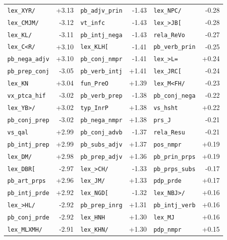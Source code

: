 \begin{longtable}{lrlrlr}
\texttt{lex\_XYR/} & +3.13 & \texttt{pb\_adjv\_prin} & -1.43 & \texttt{lex\_NPC/} & -0.28 \\
\texttt{lex\_CMJM/} & -3.12 & \texttt{vt\_infc} & -1.43 & \texttt{lex\_\textgreater{}JB[} & -0.28 \\
\texttt{lex\_KL/} & -3.11 & \texttt{pb\_intj\_nega} & -1.43 & \texttt{rela\_ReVo} & -0.27 \\
\texttt{lex\_C\textless{}R/} & +3.10 & \texttt{lex\_KLH[} & -1.41 & \texttt{pb\_verb\_prin} & -0.25 \\
\texttt{pb\_nega\_adjv} & +3.10 & \texttt{pb\_conj\_nmpr} & -1.41 & \texttt{lex\_\textgreater{}L=} & +0.24 \\
\texttt{pb\_prep\_conj} & -3.05 & \texttt{pb\_verb\_intj} & +1.41 & \texttt{lex\_JRC[} & -0.24 \\
\texttt{lex\_KN} & +3.04 & \texttt{fun\_PreO} & +1.39 & \texttt{lex\_M\textless{}FH/} & -0.23 \\
\texttt{vx\_ptca\_hif} & -3.02 & \texttt{pb\_verb\_prep} & -1.38 & \texttt{pb\_conj\_nega} & -0.22 \\
\texttt{lex\_YB\textgreater{}/} & +3.02 & \texttt{typ\_InrP} & +1.38 & \texttt{vs\_hsht} & +0.22 \\
\texttt{pb\_conj\_prep} & -3.02 & \texttt{pb\_nega\_nmpr} & +1.38 & \texttt{prs\_J} & -0.21 \\
\texttt{vs\_qal} & +2.99 & \texttt{pb\_conj\_advb} & -1.37 & \texttt{rela\_Resu} & -0.21 \\
\texttt{pb\_intj\_prep} & +2.99 & \texttt{pb\_subs\_adjv} & +1.37 & \texttt{pos\_nmpr} & +0.19 \\
\texttt{lex\_DM/} & +2.98 & \texttt{pb\_prep\_adjv} & +1.36 & \texttt{pb\_prin\_prps} & +0.19 \\
\texttt{lex\_DBR[} & -2.97 & \texttt{lex\_\textgreater{}CH/} & -1.33 & \texttt{pb\_prps\_subs} & -0.17 \\
\texttt{pb\_art\_prps} & +2.96 & \texttt{lex\_JM/} & +1.33 & \texttt{pdp\_prde} & +0.17 \\
\texttt{pb\_intj\_prde} & +2.92 & \texttt{lex\_NGD[} & -1.32 & \texttt{lex\_NBJ\textgreater{}/} & +0.16 \\
\texttt{lex\_\textgreater{}HL/} & -2.92 & \texttt{pb\_prep\_inrg} & +1.31 & \texttt{pb\_intj\_verb} & +0.16 \\
\texttt{pb\_conj\_prde} & -2.92 & \texttt{lex\_HNH} & +1.30 & \texttt{lex\_MJ} & +0.16 \\
\texttt{lex\_MLXMH/} & -2.91 & \texttt{lex\_KHN/} & +1.30 & \texttt{pdp\_nmpr} & +0.15 \\

\end{longtable}
